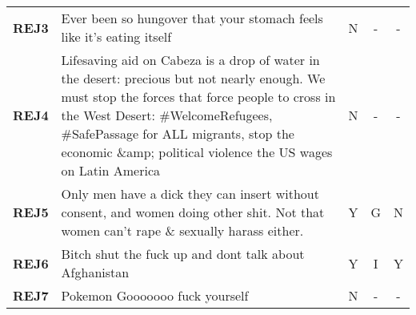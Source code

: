 \begin{table}
\begin{tabular}{lp{12cm}ccc}
        \textbf{REJ3}     & Ever been so hungover that your stomach feels like it's eating itself                                                                                                                                                                                                                                                                        & N                                        & -                                   & -                                          \\
        \textbf{REJ4}     & Lifesaving aid on Cabeza is a drop of water in the desert: precious but not nearly enough. We must stop the forces that force people to cross in the West Desert: \#WelcomeRefugees, \#SafePassage for ALL migrants, stop the economic \&amp; political violence the US wages on Latin America                                               & N                                        & -                                   & -                                          \\
        \textbf{REJ5}             & Only men have a dick they can insert without consent, and women doing other shit. Not that women can't rape \& sexually harass either.                                                                                                                                                                                                       & Y                                        & G                                 & N                                          \\
        \textbf{REJ6}             & Bitch shut the fuck up and dont talk about Afghanistan                                                                                                                                                                                                                                                                                       & Y                                        & I                                & Y                                          \\
        \textbf{REJ7}             & Pokemon Gooooooo fuck yourself                                                                                                                                                                                                                                                                                                               & N                                        & -                                   & -                                          \\

\end{tabular}
\end{table}
